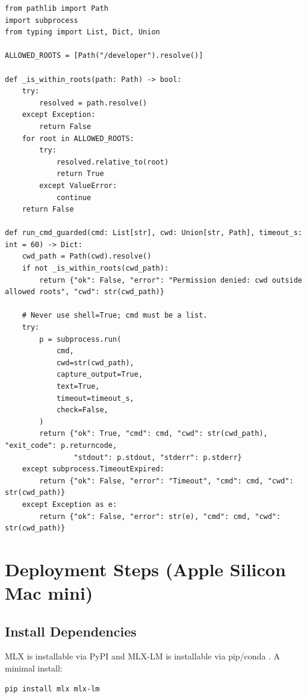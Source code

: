 \documentclass[11pt]{article}
\begin{document}
\begin{lstlisting}[style=python, caption={Safe subprocess guardrails (20--30 lines, production-friendly)}]
from pathlib import Path
import subprocess
from typing import List, Dict, Union

ALLOWED_ROOTS = [Path("/developer").resolve()]

def _is_within_roots(path: Path) -> bool:
    try:
        resolved = path.resolve()
    except Exception:
        return False
    for root in ALLOWED_ROOTS:
        try:
            resolved.relative_to(root)
            return True
        except ValueError:
            continue
    return False

def run_cmd_guarded(cmd: List[str], cwd: Union[str, Path], timeout_s: int = 60) -> Dict:
    cwd_path = Path(cwd).resolve()
    if not _is_within_roots(cwd_path):
        return {"ok": False, "error": "Permission denied: cwd outside allowed roots", "cwd": str(cwd_path)}

    # Never use shell=True; cmd must be a list.
    try:
        p = subprocess.run(
            cmd,
            cwd=str(cwd_path),
            capture_output=True,
            text=True,
            timeout=timeout_s,
            check=False,
        )
        return {"ok": True, "cmd": cmd, "cwd": str(cwd_path), "exit_code": p.returncode,
                "stdout": p.stdout, "stderr": p.stderr}
    except subprocess.TimeoutExpired:
        return {"ok": False, "error": "Timeout", "cmd": cmd, "cwd": str(cwd_path)}
    except Exception as e:
        return {"ok": False, "error": str(e), "cmd": cmd, "cwd": str(cwd_path)}
\end{lstlisting}

\section{Deployment Steps (Apple Silicon Mac mini)}

\subsection{Install Dependencies}

MLX is installable via PyPI and MLX-LM is installable via pip/conda \cite{MLX_GitHub, MLXLM_Readme}.
A minimal install:
\begin{lstlisting}[style=base, caption={Install MLX and MLX-LM}]
pip install mlx mlx-lm
\end{lstlisting}
\end{document}
